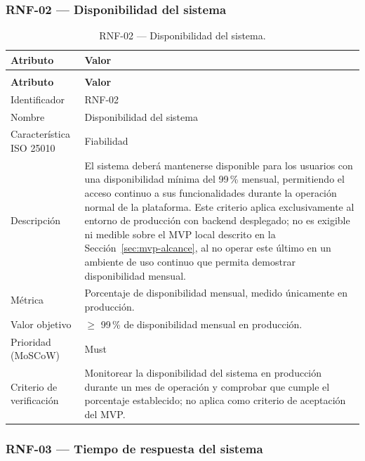 \documentclass[journal,onecolumn]{IEEEtran}
\makeatletter
\newenvironment{atributos}[2]{%
	\small
	\begin{longtable}{@{}>{\raggedright\arraybackslash}p{4.2cm} >{\raggedright\arraybackslash}p{11.2cm}@{}}
		\caption{#2}\label{tab:#1}\\
		\toprule
		\textbf{Atributo} & \textbf{Valor} \\
		\midrule
		\endfirsthead
		\multicolumn{2}{@{}l}{\small\itshape (continuación)}\\
		\toprule
		\textbf{Atributo} & \textbf{Valor} \\
		\midrule
		\endhead
		\bottomrule
		\endlastfoot
	}{%
	\end{longtable}
	\normalsize
}
\makeatother
\begin{document}
	\subsubsection{RNF-02 --- Disponibilidad del sistema}
	
	\begin{atributos}{RNF-02}{RNF-02 --- Disponibilidad del sistema.}
		Identificador & RNF-02 \\
		Nombre & Disponibilidad del sistema \\
		Característica ISO 25010 & Fiabilidad \\
		Descripción & El sistema deberá mantenerse disponible para los usuarios con una disponibilidad mínima del 99\,\% mensual, permitiendo el acceso continuo a sus funcionalidades durante la operación normal de la plataforma. Este criterio aplica exclusivamente al entorno de producción con backend desplegado; no es exigible ni medible sobre el MVP local descrito en la Sección~\ref{sec:mvp-alcance}, al no operar este último en un ambiente de uso continuo que permita demostrar disponibilidad mensual. \\
		Métrica & Porcentaje de disponibilidad mensual, medido únicamente en producción. \\
		Valor objetivo & $\geq$ 99\,\% de disponibilidad mensual en producción. \\
		Prioridad (MoSCoW) & Must \\
		Criterio de verificación & Monitorear la disponibilidad del sistema en producción durante un mes de operación y comprobar que cumple el porcentaje establecido; no aplica como criterio de aceptación del MVP. \\
	\end{atributos}
	
	
	\subsubsection{RNF-03 --- Tiempo de respuesta del sistema}
	
\end{document}
